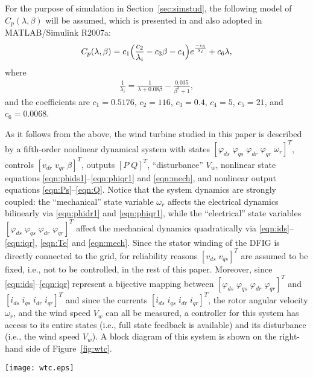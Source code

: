\documentclass[journal]{IEEEtran}
\begin{document}
For the purpose of simulation in Section~\ref{sec:simstud}, the following model of $C_p(\lambda, \beta)$ will be assumed, which is presented in \cite{Heier98} and also adopted in MATLAB/Simulink R2007a:
\begin{align}
C_p(\lambda,\beta)=c_1\Bigl(\frac{c_2}{\lambda_i}-c_3\beta-c_4\Bigl)e^{\frac{-c_5}{\lambda_i}}+c_6\lambda,\label{eqn:cp}
\end{align}
where
\begin{align}
\frac{1}{\lambda_i}=\frac{1}{\lambda+0.08\beta}-\frac{0.035}{\beta^3+1},\label{eqn:lambdai}
\end{align}
and the coefficients are $c_1=0.5176$, $c_2=116$, $c_3=0.4$, $c_4=5$, $c_5=21$, and $c_6=0.0068$.

As it follows from the above, the wind turbine studied in this paper is described by a fifth-order nonlinear dynamical system with states $[\varphi_{ds}\; \varphi_{qs}\; \varphi_{dr}\; \varphi_{qr}\; \omega_r]^T$, controls $[v_{dr}\; v_{qr}\; \beta]^T$, outputs $[P\; Q]^T$, ``disturbance'' $V_w$, nonlinear state equations \eqref{eqn:phids1}--\eqref{eqn:phiqr1} and \eqref{eqn:mech}, and nonlinear output equations \eqref{eqn:Ps}--\eqref{eqn:Q}. Notice that the system dynamics are strongly coupled: the ``mechanical'' state variable $\omega_r$ affects the electrical dynamics bilinearly via \eqref{eqn:phidr1} and \eqref{eqn:phiqr1}, while the ``electrical'' state variables $[\varphi_{ds}\; \varphi_{qs}\; \varphi_{dr}\; \varphi_{qr}]^T$ affect the mechanical dynamics quadratically via \eqref{eqn:ids}--\eqref{eqn:iqr}, \eqref{eqn:Te} and \eqref{eqn:mech}. Since the stator winding of the DFIG is directly connected to the grid, for reliability reasons $[v_{ds}\; v_{qs}]^T$ are assumed to be fixed, i.e., not to be controlled, in the rest of this paper. Moreover, since \eqref{eqn:ids}--\eqref{eqn:iqr} represent a bijective mapping between $[\varphi_{ds}\; \varphi_{qs}\; \varphi_{dr}\; \varphi_{qr}]^T$ and $[i_{ds}\; i_{qs}\; i_{dr}\; i_{qr}]^T$ and since the currents $[i_{ds}\; i_{qs}\; i_{dr}\; i_{qr}]^T$, the rotor angular velocity $\omega_r$, and the wind speed $V_w$ can all be measured, a controller for this system has access to its entire states (i.e., full state feedback is available) and its disturbance (i.e., the wind speed $V_w$). A block diagram of this system is shown on the right-hand side of Figure~\ref{fig:wtc}.

\begin{figure*}[tb]
\centering\texttt{[image: wtc.eps]}
\caption{Structure of the multivariable, feedback/feedforward nonlinear controller, developed based on original, nonlinear dynamics of the wind turbine.}
\label{fig:wtc}
\end{figure*}
\end{document}
